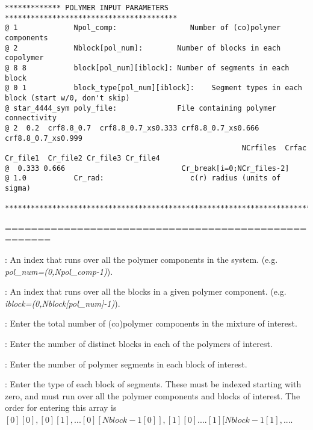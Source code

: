 \documentclass[10pt,onecolumn]{article}
\begin{document}
\begin{verbatim}
************* POLYMER INPUT PARAMETERS ****************************************
@ 1             Npol_comp:                 Number of (co)polymer components
@ 2             Nblock[pol_num]:        Number of blocks in each copolymer
@ 8 8           block[pol_num][iblock]: Number of segments in each block
@ 0 1           block_type[pol_num][iblock]:    Segment types in each block (start w/0, don't skip)
@ star_4444_sym poly_file:              File containing polymer connectivity
@ 2  0.2  crf8.8_0.7  crf8.8_0.7_xs0.333 crf8.8_0.7_xs0.666 crf8.8_0.7_xs0.999     
                                                       NCrfiles  Crfac  Cr_file1  Cr_file2 Cr_file3 Cr_file4
@  0.333 0.666                           Cr_break[i=0;NCr_files-2]
@ 1.0           Cr_rad:                    c(r) radius (units of sigma)

***********************************************************************
\end{verbatim}

\noindent=====================================================
\vspace{0.1in}

:  An index that runs over all the polymer components
                            in the system.
                             (e.g. {\it pol\_num=(0,Npol\_comp-1)}).

\vspace{0.1in}
:  An index that runs over all the blocks in a
                        given polymer component.
                        (e.g. {\it iblock=(0,Nblock[pol\_num]-1)}).

\vspace{0.1in}
: Enter the total number of (co)polymer
                          components in the mixture of interest.

\vspace{0.1in}
: Enter the number of distinct blocks
                          in each of the polymers of interest.

\vspace{0.1in}
:  Enter the number of polymer
                          segments in each block of interest.

\vspace{0.1in}
:  Enter the type of
                          each block of segments.  These must be
                          indexed starting with zero, and must
                          run over all the polymer components and
                          blocks of interest.   The order for
                          entering this array is
  $[0][0], [0][1],... [0][Nblock-1[0]],[1][0]....[1][Nblock-1[1], ...$.
\end{document}
